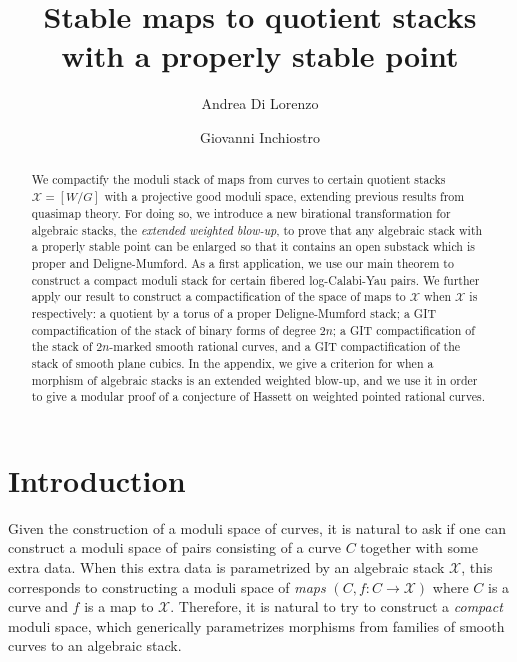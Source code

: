 \documentclass{amsart}
\newcommand{\cX}{\mathcal{X}}
\theoremstyle{definition}
\theoremstyle{definition}
\begin{document}
\title[Stable maps to quotient stacks with a properly stable point]{Stable maps to quotient stacks with a properly stable point}
	\author[A. Di Lorenzo]{Andrea Di Lorenzo}
	\address[A. Di Lorenzo]{University of Pisa, Italy}
	\author[G. Inchiostro]{Giovanni Inchiostro}
	\address[G. Inchiostro]{University of Washington, Seattle, Washington, USA}
	\maketitle
	\begin{abstract}
		We compactify the moduli stack of maps from curves to certain quotient stacks $\cX=[W/G]$ with a projective good moduli space, extending previous results from quasimap theory. For doing so, we introduce a new birational transformation for algebraic stacks, the \textit{extended weighted blow-up}, to prove that any algebraic stack with a properly stable point can be enlarged so that it contains an open substack which is proper and Deligne-Mumford.  
        {As a first application, we use our main theorem to construct a compact moduli stack for certain fibered log-Calabi-Yau pairs. We further apply our result to construct a compactification of the space of maps to $\cX$ when $\cX$ is respectively: a quotient by a torus of a proper Deligne-Mumford stack; a GIT compactification of the stack of binary forms of degree $2n$; a GIT compactification of the stack of $2n$-marked smooth rational curves, and a GIT compactification of the stack of smooth plane cubics.}
        In the appendix, we give a criterion for when a morphism of algebraic stacks is an extended weighted blow-up, and we use it in order to give a modular proof of a conjecture of Hassett on weighted pointed rational curves.
	\end{abstract}
 \section{Introduction}
 Given the construction of a moduli space of curves, it is natural to ask if one can construct a moduli space of pairs consisting of a curve $C$ together with some extra data.
 When this extra data is parametrized by an algebraic stack $\cX$, this corresponds to constructing a moduli space of \textit{maps} $(C, f:C\to \cX)$ where $C$ is a curve and $f$ is a map to $\cX$.
Therefore, it is natural to try to construct a \textit{compact} moduli space, which generically parametrizes morphisms from families of smooth curves to an algebraic stack.
\end{document}
